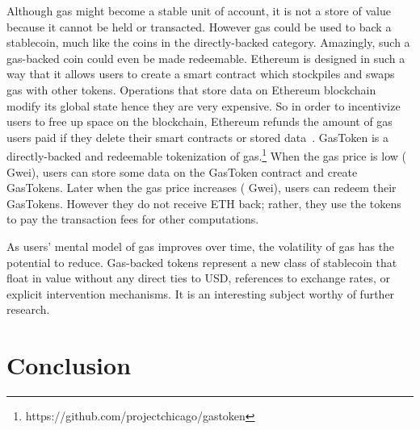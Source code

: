 Although gas might become a stable unit of account, it is not a store of value because it cannot be held or transacted. However gas could be used to back a stablecoin, much like the coins in the directly-backed category. Amazingly, such a gas-backed coin could even be made redeemable. Ethereum is designed in such a way that it allows users to create a smart contract which stockpiles and swaps gas with other tokens. Operations that store data on Ethereum blockchain modify its global state hence they are very expensive. So in order to incentivize users to free up space on the blockchain, Ethereum refunds the amount of gas users paid if they delete their smart contracts or stored data~\cite{wood2014ethereum}. GasToken is a directly-backed and redeemable tokenization of gas.\footnote{https://github.com/projectchicago/gastoken} When the gas price is low ( Gwei), users can store some data on the GasToken contract and create GasTokens. Later when the gas price increases ( Gwei), users can redeem their GasTokens. However they do not receive ETH back; rather, they use the tokens to pay the transaction fees for other computations. 

As users' mental model of gas improves over time, the volatility of gas has the potential to reduce. Gas-backed tokens represent a new class of stablecoin that float in value without any direct ties to USD, references to exchange rates, or explicit intervention mechanisms. It is an interesting subject worthy of further research. 








\section{Conclusion}

